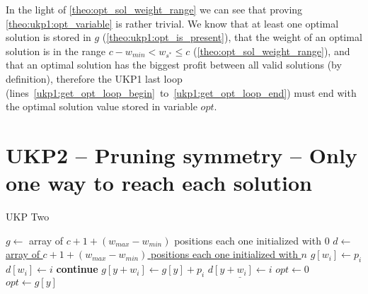 \documentclass[12pt]{article}
\begin{document}
In the light of \autoref{theo:opt_sol_weight_range} we can see that proving \autoref{theo:ukp1:opt_variable} is rather trivial. We know that at least one optimal solution is stored in \(g\) (\autoref{theo:ukp1:opt_is_present}), that the weight of an optimal solution is in the range \(c - w_{min} < w_{s^*} \leq c\) (\autoref{theo:opt_sol_weight_range}), and that an optimal solution has the biggest profit between all valid solutions (by definition), therefore the UKP1 last loop (lines~\ref{ukp1:get_opt_loop_begin}~to~\ref{ukp1:get_opt_loop_end}) must end with the optimal solution value stored in variable \(opt\).

\section{UKP2 -- Pruning symmetry -- Only one way to reach each solution}

\begin{algorithm}[H]
\caption{UKP Two}\label{alg:ukp1}
\begin{algorithmic}[1]
  \State \(g \gets\) array of \(c + 1 + (w_{max} - w_{min})\) positions each one initialized with \(0\)\label{ukp2:create_g}
  \State \underline{\(d \gets\) array of \(c + 1 + (w_{max} - w_{min})\) positions each one initialized with \(n\)\label{ukp2:create_d}}
  \State %
  \label{ukp2:begin_trivial_bounds}
      \State \(g[w_i] \gets p_i\)
      \State \underline{\(d[w_i] \gets i\)}
    \EndIf
  \EndFor\label{ukp2:end_trivial_bounds}
  \State %
  \label{ukp2:main_ext_loop_begin}
    \label{ukp2:if_equal_to_zero}
    	\State \textbf{continue}
    \EndIf\label{ukp2:if_equal_to_zero}
    \State %
    \label{ukp2:main_inner_loop_begin}
      \label{ukp2:if_better_solution_begin}
        \State \(g[y + w_i] \gets g[y] + p_i\)
        \State \(\underline{d[y + w_i] \gets i}\)
      \EndIf\label{ukp2:if_better_solution_end}
    \EndFor\label{ukp2:main_inner_loop_end}
  \EndFor\label{ukp2:main_ext_loop_end}
  \State %
  \State \(opt \gets 0\)
  \label{ukp2:get_opt_loop_begin}
    \label{ukp2:opt_loop_if}
      \State \(opt \gets g[y]\)
    \EndIf
  \EndFor\label{ukp2:get_opt_loop_end}
\EndProcedure
\end{algorithmic}
\end{algorithm}
\end{document}
